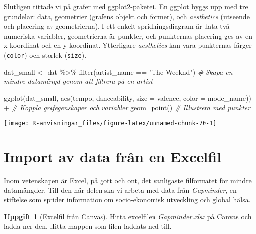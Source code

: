 \documentclass[
]{book}
\newenvironment{Shaded}{\begin{snugshade}}{\end{snugshade}}
\newcommand{\AttributeTok}[1]{\textcolor[rgb]{0.77,0.63,0.00}{#1}}
\newcommand{\CommentTok}[1]{\textcolor[rgb]{0.56,0.35,0.01}{\textit{#1}}}
\newcommand{\FunctionTok}[1]{\textcolor[rgb]{0.00,0.00,0.00}{#1}}
\newcommand{\NormalTok}[1]{#1}
\newcommand{\OtherTok}[1]{\textcolor[rgb]{0.56,0.35,0.01}{#1}}
\newcommand{\SpecialCharTok}[1]{\textcolor[rgb]{0.00,0.00,0.00}{#1}}
\newcommand{\StringTok}[1]{\textcolor[rgb]{0.31,0.60,0.02}{#1}}
\theoremstyle{definition}
\theoremstyle{definition}
\theoremstyle{definition}
\newtheorem{exercise}{Uppgift}[chapter]
\theoremstyle{definition}
\theoremstyle{remark}
\begin{document}
Slutligen tittade vi på grafer med ggplot2-paketet. En ggplot byggs upp med tre grundelar: data, geometrier (grafens objekt och former), och \emph{aesthetics} (utseende och placering av geometrierna). I ett enkelt spridningsdiagram är data två numeriska variabler, geometrierna är punkter, och punkternas placering ges av en x-koordinat och en y-koordinat. Ytterligare \emph{aesthetics} kan vara punkternas färger (\texttt{color}) och storlek (\texttt{size}).

\begin{Shaded}
\begin{Highlighting}[]
\NormalTok{dat\_small }\OtherTok{\textless{}{-}}\NormalTok{ dat }\SpecialCharTok{\%\textgreater{}\%} \FunctionTok{filter}\NormalTok{(artist\_name }\SpecialCharTok{==} \StringTok{"The Weeknd"}\NormalTok{)                            }\CommentTok{\# Skapa en mindre datamängd genom att filtrera på en artist}

\FunctionTok{ggplot}\NormalTok{(dat\_small, }\FunctionTok{aes}\NormalTok{(tempo, danceability, }\AttributeTok{size =}\NormalTok{ valence, }\AttributeTok{color =}\NormalTok{ mode\_name)) }\SpecialCharTok{+}    \CommentTok{\# Koppla grafegenskaper och variabler}
  \FunctionTok{geom\_point}\NormalTok{()                                                                      }\CommentTok{\# Illustrera med punkter}
\end{Highlighting}
\end{Shaded}

\begin{center}\texttt{[image: R-anvisningar\_files/figure-latex/unnamed-chunk-70-1]} \end{center}

\hypertarget{import-av-data-fruxe5n-en-excelfil}{%
\section{Import av data från en Excelfil}\label{import-av-data-fruxe5n-en-excelfil}}

Inom vetenskapen är Excel, på gott och ont, det vanligaste filformatet för mindre datamängder. Till den här delen ska vi arbeta med data från \emph{Gapminder}, en stiftelse som sprider information om socio-ekonomisk utveckling och global hälsa.

\begin{exercise}[Excelfil från Canvas]
Hitta excelfilen \emph{Gapminder.xlsx} på Canvas och ladda ner den. Hitta mappen som filen laddats ned till.
\end{exercise}
\end{document}
